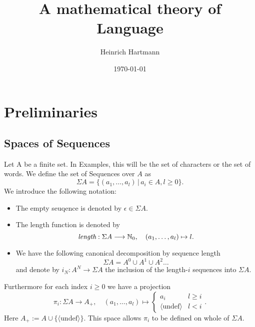 \documentclass[11pt]{article}
\author{Heinrich Hartmann}
\date{\today}
\title{A mathematical theory of Language}
\begin{document}
\maketitle
\tableofcontents


\newcommand{\DEF}[1]{{\it #1}} %
\newcommand{\EQUIV}{\Leftrightarrow} %

\newcommand{\IN}{{\mathbb N}}
\newcommand{\IR}{{\mathbb R}}
\newcommand{\ra}{\rightarrow}
\newcommand{\lra}{\longrightarrow}
\newcommand{\union}{\cup}
\newcommand{\isect}{\cap}
 
\section{Preliminaries}
\subsection{Spaces of Sequences}
\label{sec-1-1}

\newcommand{\SEQ}{\Sigma}
\newcommand{\len}{\text{\it length}}

Let A be a finite set. In Examples, this will be the set of characters
or the set of words. We define the set of Sequences over $A$ as 
\[ \SEQ A = \{ (a_1,\dots,a_l) \,|\, a_i \in A, l \geq 0 \}. \] 
We introduce the following notation:
\begin{itemize}
\item The empty seuqence is denoted by $\epsilon \in \SEQ A$.
\item The length function is denoted by
  \[ \len: \SEQ A \lra \IN_0,\quad (a_1,\dots,a_l) \mapsto l. \]
\item We have the following canonical decomposition by sequence length
\[ \SEQ A = A^0 \union A^1 \union A^2 \dots \]
and denote by $i_N: A^N \ra \SEQ A$ the inclusion of the length-$i$ sequences into $\SEQ A$.

\end{itemize}

\newcommand{\pr}[1]{{\pi_{#1}}}
\newcommand{\PR}[2]{{\pi_{#1}^{#2}}}
\newcommand{\undef}{\langle \mathrm{undef} \rangle}

Furthermore for each index $i \geq 0$ we have a projection
\[ \pr{i}: \SEQ A \lra A_+, \quad (a_1, \dots, a_l) \mapsto 
\begin{cases}
  a_i & l \geq i  \\
  \undef & l < i
\end{cases}
. \]
Here $A_+ := A \union \{ \undef \}$. This space allows
$\pr{i}$ to be defined on whole of $\SEQ A$.
\end{document}
